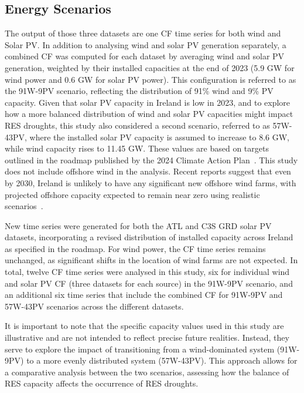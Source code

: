 \documentclass[preprint, 12pt]{elsarticle}
\begin{document}
\subsection{Energy Scenarios}
\label{sec:scenarios}

The output of those three datasets are one CF time series for both wind and Solar PV. In addition to analysing wind and solar PV generation separately, a combined CF was computed for each dataset by averaging wind and solar PV generation, weighted by their installed capacities at the end of 2023 (5.9 GW for wind power and 0.6 GW for solar PV power). This configuration is referred to as the 91W-9PV scenario, reflecting the distribution of 91\% wind and 9\% PV capacity. Given that solar PV capacity in Ireland is low in 2023, and to explore how a more balanced distribution of wind and solar PV capacities might impact RES droughts, this study also considered a second scenario, referred to as 57W-43PV, where the installed solar PV capacity is assumed to increase to 8.6 GW, while wind capacity rises to 11.45 GW. These values are based on targets outlined in the roadmap published by the 2024 Climate Action Plan~\citep{cap2024future}. This study does not include offshore wind in the analysis. Recent reports suggest that even by 2030, Ireland is unlikely to have any significant new offshore wind farms, with projected offshore capacity expected to remain near zero using realistic scenarios~\citep{seai2024future}.

New time series were generated for both the ATL and C3S GRD solar PV datasets, incorporating a revised distribution of installed capacity across Ireland as specified in the roadmap. For wind power, the CF time series remains unchanged, as significant shifts in the location of wind farms are not expected. In total, twelve CF time series were analysed in this study, six for individual wind and solar PV CF (three datasets for each source) in the 91W-9PV scenario, and an additional six time series that include the combined CF for 91W-9PV and 57W-43PV scenarios across the different datasets.

It is important to note that the specific capacity values used in this study are illustrative and are not intended to reflect precise future realities. Instead, they serve to explore the impact of transitioning from a wind-dominated system (91W-9PV) to a more evenly distributed system (57W-43PV). This approach allows for a comparative analysis between the two scenarios, assessing how the balance of RES capacity affects the occurrence of RES droughts.
\end{document}
